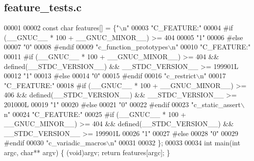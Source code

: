 \subsection{feature\+\_\+tests.\+c}
\label{gr-radar-dev_2build_2CMakeFiles_2feature__tests_8c_source}

\begin{DoxyCode}
00001 
00002   \textcolor{keyword}{const} \textcolor{keywordtype}{char} features[] = \{\textcolor{stringliteral}{"\(\backslash\)n"}
00003 \textcolor{stringliteral}{"C\_FEATURE:"}
00004 \textcolor{preprocessor}{#if (\_\_GNUC\_\_ * 100 + \_\_GNUC\_MINOR\_\_) >= 404}
00005 \textcolor{stringliteral}{"1"}
00006 \textcolor{preprocessor}{#else}
00007 \textcolor{stringliteral}{"0"}
00008 \textcolor{preprocessor}{#endif}
00009 \textcolor{stringliteral}{"c\_function\_prototypes\(\backslash\)n"}
00010 \textcolor{stringliteral}{"C\_FEATURE:"}
00011 \textcolor{preprocessor}{#if (\_\_GNUC\_\_ * 100 + \_\_GNUC\_MINOR\_\_) >= 404 && defined(\_\_STDC\_VERSION\_\_) && \_\_STDC\_VERSION\_\_ >= 199901L}
00012 \textcolor{stringliteral}{"1"}
00013 \textcolor{preprocessor}{#else}
00014 \textcolor{stringliteral}{"0"}
00015 \textcolor{preprocessor}{#endif}
00016 \textcolor{stringliteral}{"c\_restrict\(\backslash\)n"}
00017 \textcolor{stringliteral}{"C\_FEATURE:"}
00018 \textcolor{preprocessor}{#if (\_\_GNUC\_\_ * 100 + \_\_GNUC\_MINOR\_\_) >= 406 && defined(\_\_STDC\_VERSION\_\_) && \_\_STDC\_VERSION\_\_ >= 201000L}
00019 \textcolor{stringliteral}{"1"}
00020 \textcolor{preprocessor}{#else}
00021 \textcolor{stringliteral}{"0"}
00022 \textcolor{preprocessor}{#endif}
00023 \textcolor{stringliteral}{"c\_static\_assert\(\backslash\)n"}
00024 \textcolor{stringliteral}{"C\_FEATURE:"}
00025 \textcolor{preprocessor}{#if (\_\_GNUC\_\_ * 100 + \_\_GNUC\_MINOR\_\_) >= 404 && defined(\_\_STDC\_VERSION\_\_) && \_\_STDC\_VERSION\_\_ >= 199901L}
00026 \textcolor{stringliteral}{"1"}
00027 \textcolor{preprocessor}{#else}
00028 \textcolor{stringliteral}{"0"}
00029 \textcolor{preprocessor}{#endif}
00030 \textcolor{stringliteral}{"c\_variadic\_macros\(\backslash\)n"}
00031 
00032 \};
00033 
00034 \textcolor{keywordtype}{int} main(\textcolor{keywordtype}{int} argc, \textcolor{keywordtype}{char}** argv) \{ (void)argv; \textcolor{keywordflow}{return} features[argc]; \}
\end{DoxyCode}
